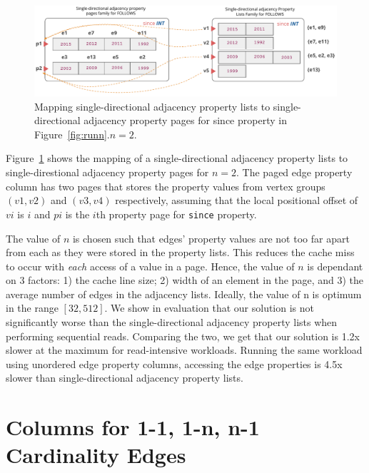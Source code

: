 \begin{figure}
	\vspace{-40pt}
	\hfill\includegraphics[scale=0.78]{img/paged}\hspace*{\fill}
	\captionsetup{justification=centering}
	\caption{Mapping single-directional adjacency property lists to single-directional adjacency property pages for since property in Figure~\ref{fig:runn}.$n=2$.}
	\label{fig:paged}
	\vspace{-5pt}
\end{figure}

Figure~\ref{fig:paged} shows the mapping of a single-directional adjacency property lists to single-direstional adjacency property pages for $n=2$. The paged edge property column has two pages that stores the property values from vertex groups $(v1,v2)$ and $(v3,v4)$ respectively, assuming that the local positional offset of $vi$ is $i$ and $pi$ is the $i$th property page for \texttt{since} property. 

The value of $n$ is chosen such that edges' property values are not too far apart from each as they were stored in the property lists. This reduces the cache miss to occur with \emph{each} access of a value in a page. Hence, the value of $n$ is dependant on 3 factors: 1) the cache line size; 2) width of an element in the page, and 3) the average number of edges in the adjacency lists. Ideally, the value of n is optimum in the range $[32, 512]$. We show in evaluation that our solution is not significantly worse than the single-directional adjacency property lists when performing sequential reads. Comparing the two, we get that our solution is 1.2x slower at the maximum for read-intensive workloads. Running the same workload using unordered edge property columns, accessing the edge properties is 4.5x slower than single-directional adjacency property lists.

\section{Columns for 1-1, 1-n, n-1 Cardinality Edges}
\label{sec:cols-for-single-cardinality}

